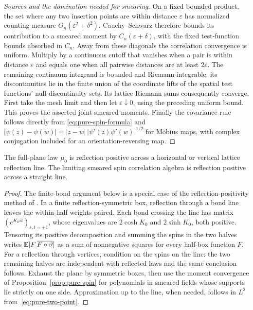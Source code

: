 \begin{proof}[Sources and the domination needed for smearing]
On a fixed bounded product, the set where any two insertion points
are within distance \(\varepsilon\) has normalized counting measure
\(O_n(\varepsilon^2+\delta^2)\). Cauchy--Schwarz therefore bounds
its contribution to a smeared moment by
\(C_n(\varepsilon+\delta)\), with the fixed test-function bounds
absorbed in \(C_n\). Away from these diagonals the correlation
convergence is uniform. Multiply by a continuous cutoff that vanishes
when a pair is within distance \(\varepsilon\) and equals one when
all pairwise distances are at least \(2\varepsilon\).
The remaining continuum integrand is bounded and
Riemann integrable: its discontinuities lie in the finite union of
the coordinate lifts of the spatial test functions' null discontinuity
sets. Its lattice Riemann sums consequently converge. First take the
mesh limit and then let \(\varepsilon\downarrow0\), using the
preceding uniform bound. This proves the asserted joint smeared
moments.
Finally the covariance rule follows directly from
\eqref{eq:pure-spin-formula} and
\(|\psi(z)-\psi(w)|=|z-w|\,|\psi'(z)\psi'(w)|^{1/2}\)
for M\"obius maps, with complex conjugation included for an
orientation-reversing map.
\end{proof}

\begin{lemma}
\label{lem:pure-reflection}
The full-plane law \(\mu_0\) is reflection positive across a horizontal
or vertical lattice reflection line. The limiting smeared spin
correlation algebra is reflection positive across a straight line.
\end{lemma}

\begin{proof}
The finite-bond argument below is a special case of the
reflection-positivity method of \citet{FILS1978}. In a finite
reflection-symmetric box, reflection through a bond line
leaves the within-half weights paired. Each bond crossing the line has
matrix \((e^{K_0st})_{s,t=\pm1}\), whose eigenvalues are
\(2\cosh K_0\) and \(2\sinh K_0\), both positive. Tensoring its
positive decomposition and summing the spins in the two halves writes
\(\mathbb E[F\,\overline{F\circ\vartheta}]\) as a sum of nonnegative
squares for every half-box function \(F\). For a reflection through
vertices, condition on the spins on the line: the two remaining halves
are independent with reflected laws and the same conclusion follows.
Exhaust the plane by symmetric boxes, then use the moment convergence
of Proposition~\ref{prop:pure-spin} for polynomials in smeared fields
whose supports lie strictly on one side. Approximation up to the line,
when needed, follows in \(L^2\) from~\eqref{eq:pure-two-point}.
\end{proof}


